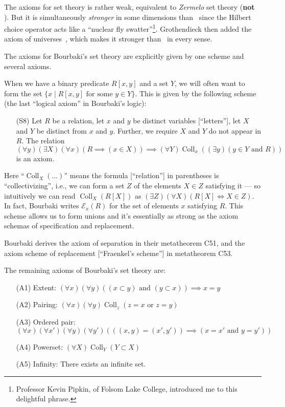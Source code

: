 \begin{node}\label{bourbaki-000F}%
The axioms for set theory is rather weak, equivalent to \emph{Zermelo}
set theory (\textbf{not} \ZF). But it is simultaneously \emph{stronger}
in some dimensions than \ZFC\ since the Hilbert choice operator acts
like a ``nuclear fly swatter''\footnote{Professor Kevin Pipkin, of
Folsom Lake College, introduced me to this delightful phrase.}.
Grothendieck then added the axiom of universes~, which
makes it stronger than \ZFC\ in every sense.

The axioms for Bourbaki's set theory are explicitly given by one scheme
and several axioms. 

\begin{node}\label{bourbaki-000G}%
When we have a binary predicate $R[x,y]$ and a set $Y$, we will often
want to form the set $\{x\mid R[x,y]\mbox{ for some }y\in Y\}$. This is
given by the following scheme (the last ``logical axiom'' in Bourbaki's logic):
\begin{itemize}
\item[(S8)] Let $R$ be a relation, let $x$ and $y$ be distinct variables [``letters''],
let $X$ and $Y$ be distinct from $x$ and $y$. Further, we require $X$
and $Y$ do not appear in $R$. The relation
\[(\forall y)(\exists X)(\forall x)(R\implies(x\in X))\implies(\forall Y)\operatorname{Coll}_{x}((\exists y)(y\in Y\mbox{ and }R)) \]
is an axiom.
\end{itemize}
Here ``$\operatorname{Coll}_{X}(\dots)$'' means the formula
[``relation''] in parentheses is ``collectivizing'', i.e., we can form a
set $Z$ of the elements $X\in Z$ satisfying it --- so intuitively we can
read $\operatorname{Coll}_{X}(R[X])$ as $(\exists Z)(\forall X)(R[X]\iff X\in Z)$.
In fact, Bourbaki writes $\mathcal{E}_{x}(R)$ for the set of elements
$x$ satisfying $R$.
This scheme allows us to form unions and it's essentially as strong as
the axiom schemas of specification and replacement.

Bourbaki derives the axiom of separation in their metatheorem C51, and
the axiom scheme of replacement [``Fraenkel's scheme''] in metatheorem C53. 
\end{node}

\begin{node}[Axioms]\label{bourbaki-000H}%
The remaining axioms of Bourbaki's set theory are:
\begin{itemize}
\item[(A1)] Extent: $(\forall x)(\forall y)((x\subset y)\mbox{ and }(y\subset x))\implies x=y$
\item[(A2)] Pairing: $(\forall x)(\forall y)\operatorname{Coll}_{z}(z=x\mbox{ or }z=y)$
\item[(A3)] Ordered pair: $(\forall x)(\forall x')(\forall y)(\forall y')(((x,y)=(x',y'))\implies(x=x'\mbox{ and }y=y'))$
\item[(A4)] Powerset: $(\forall X)\operatorname{Coll}_{Y}(Y\subset X)$
\item[(A5)] Infinity: There exists an infinite set.
\end{itemize}
\end{node}


\end{node}
